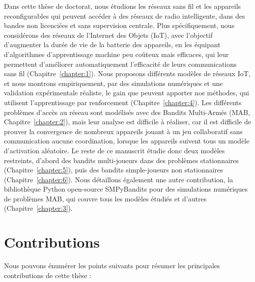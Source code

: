 \begin{resume_fr}



Dans cette thèse de doctorat, nous étudions les réseaux sans fil et les appareils reconfigurables qui peuvent accéder à des réseaux de radio intelligente, dans des bandes non licenciées et sans supervision centrale.
Plus spécifiquement, nous considérons des réseaux de l'Internet des Objets (IoT), avec l'objectif d'augmenter la durée de vie de la batterie des appareils, en les équipant d'algorithmes d'apprentissage machine peu coûteux mais efficaces, qui leur permettent d'améliorer automatiquement l'efficacité de leurs communications sans fil (Chapitre~\ref{chapter:1}).
Nous proposons différents modèles de réseaux IoT, et nous montrons empiriquement, par des simulations numériques et une validation expérimentale réaliste, le gain que peuvent apporter nos méthodes, qui utilisent l'apprentissage par renforcement (Chapitre~\ref{chapter:4}).
Les différents problèmes d'accès au réseau sont modélisés avec des Bandits Multi-Armés (MAB, Chapitre~\ref{chapter:2}), mais leur analyse est difficile à réaliser,
car il est difficile de prouver la convergence de nombreux appareils jouant à un jeu collaboratif sans communication aucune coordination, lorsque les appareils suivent tous un modèle d'activation aléatoire.
Le reste de ce manuscrit étudie donc deux modèles restreints, d'abord des bandits multi-joueurs dans des problèmes stationnaires (Chapitre~\ref{chapter:5}), puis des bandits simple-joueurs non stationnaires (Chapitre~\ref{chapter:6}).
Nous détaillons également une autre contribution, la bibliothèque Python open-source SMPyBandits pour des simulations numériques de problèmes MAB, qui couvre tous les modèles étudiés et d'autres (Chapitre~\ref{chapter:3}).


\section*{Contributions}

Nous pouvons énumérer les points suivants pour résumer les principales contributions de cette thèse :


\end{resume_fr}
